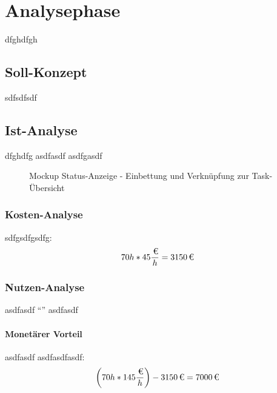 \section{Analysephase}
\label{sec:Analysephase}
dfghdfgh

\subsection{Soll-Konzept}
\label{sub:Soll-Konzept}
sdfsdfsdf

\subsection{Ist-Analyse}
\label{sub:Ist-Analyse}
dfghdfg
asdfasdf  asdfgasdf

\begin{figure}[t]
    \centering
    \caption{Mockup Status-Anzeige - Einbettung und Verknüpfung zur Task-Übersicht}
    \label{app:Mockup}
\end{figure}

\subsubsection{Kosten-Analyse}
\label{subsub:Kosten-Analyse}
sdfgsdfgsdfg:
\[ 70h * 45{\frac{\eur{}}{h}} = \eur{3150} \]

\subsubsection{Nutzen-Analyse}
\label{subsub:Nutzen-Analyse}
asdfasdf "`\titel"' asdfasdf

\paragraph{Monetärer Vorteil}
asdfasdf  asdfasdfasdf:
\[ \bigg(70h * 145{\frac{\eur{}}{h}}\bigg) - \eur{3150} = \eur{7000} \]

